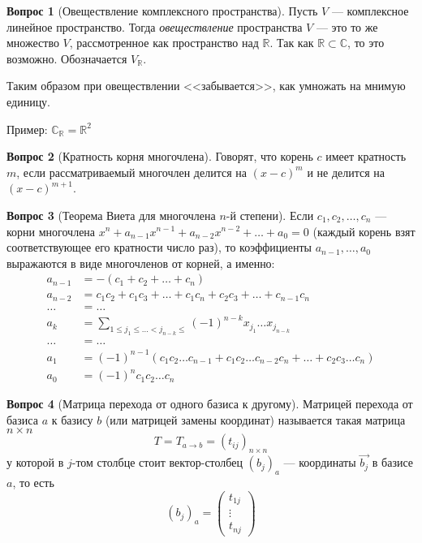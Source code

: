\documentclass[a4paper,11pt]{article}
\theoremstyle{remark}
\theoremstyle{definition}
\newtheorem{question}{Вопрос}
\begin{document}
\begin{question}[Овеществление комплексного пространства]
Пусть \(V\) --- комплексное линейное пространство. Тогда \emph{овеществление} пространства \(V\) --- это то же множество \(V\), рассмотренное как пространство над \(\mathbb{R}\). Так как \(\mathbb{R} \subset \mathbb{C}\), то это возможно. Обозначается \(V_{\mathbb{R}}\).

Таким образом при овеществлении <<забывается>>, как умножать на мнимую единицу.

Пример: \(\mathbb{C}_{\mathbb{R}} = \mathbb{R}^2\)
\end{question}


\begin{question}[Кратность корня многочлена] 
Говорят, что корень \(c\) имеет кратность \(m\), если рассматриваемый многочлен делится на \((x-c)^m\) и не делится на \((x-c)^{m+1}\).
\end{question}


\begin{question}[Теорема Виета для многочлена \(n\)-й степени]
Если \(c_1,c_2,\dots,c_n\) --- корни многочлена \(x^n + a_{n-1}x^{n-1} + a_{n-2}x^{n-2} + \dots + a_0 = 0\) (каждый корень взят соответствующее его кратности число раз), то коэффициенты \(a_{n-1}, \dots, a_0\) выражаются в виде многочленов от корней, а именно:
\begin{align*}
    a_{n-1} &= -(c_1 + c_2 + \dots + c_n) \\
    a_{n-2} &= c_1c_2 + c_1c_3 + \dots + c_1c_n + c_2c_3 + \dots + c_{n-1}c_n \\
    \dots &= \dots \\
    a_{k} &= \sum_{1 \leqslant j_1 \leqslant \dots < j_{n-k} \leqslant}(-1)^{n-k} x_{j_1} \dots x_{j_{n-k}} \\
    \dots &= \dots \\
    a_1 &= (-1)^{n-1}(c_1c_2\dots{}c_{n-1} + c_1c_2\dots{}c_{n-2}c_n + \dots + c_2c_3\dots{}c_n) \\
    a_0 &= (-1)^nc_1c_2\dots{}c_n
\end{align*}
\end{question}

\begin{question}[Матрица перехода от одного базиса к другому]
Матрицей перехода от базиса \(a\) к базису \(b\) (или матрицей замены координат) называется такая матрица \(n \times n\)
\begin{equation*}
    T = T_{a \rightarrow b} = (t_{ij})_{n \times n}
\end{equation*}
у которой в \(j\)-том столбце стоит вектор-столбец \((b_j)_a\) --- координаты \(\vec{b_j}\) в базисе \(a\), то есть
\begin{equation*}
    (b_j)_a =
    \begin{pmatrix}
        t_{1j} \\
        \vdots \\
        t_{nj}
    \end{pmatrix} 
\end{equation*}
\end{question}
\end{document}
